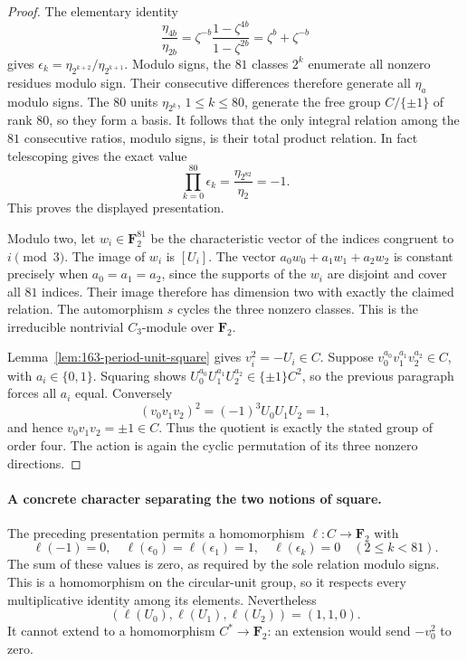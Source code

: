 \begin{proof}
The elementary identity
\[
 \frac{\eta_{4b}}{\eta_{2b}}
 =\zeta^{-b}\frac{1-\zeta^{4b}}{1-\zeta^{2b}}
 =\zeta^b+\zeta^{-b}
\]
gives
\(\epsilon_k=\eta_{2^{k+2}}/\eta_{2^{k+1}}\).
Modulo signs, the \(81\) classes \(2^k\) enumerate all nonzero
residues modulo sign.  Their consecutive differences therefore
generate all \(\eta_a\) modulo signs.  The \(80\) units
\(\eta_{2^k}\), \(1\leq k\leq80\), generate the free group
\(C/\{\pm1\}\) of rank \(80\), so they form a basis.
It follows that the only integral relation among the \(81\)
consecutive ratios, modulo signs, is their total product relation.
In fact telescoping gives the exact value
\[
 \prod_{k=0}^{80}\epsilon_k
 =\frac{\eta_{2^{82}}}{\eta_2}=-1.
\]
This proves the displayed presentation.

Modulo two, let \(w_i\in\mathbf F_2^{81}\) be the characteristic
vector of the indices congruent to \(i\pmod3\).  The image of
\(w_i\) is \([U_i]\).  The vector
\(a_0w_0+a_1w_1+a_2w_2\) is constant precisely when
\(a_0=a_1=a_2\), since the supports of the \(w_i\) are disjoint
and cover all \(81\) indices.  Their image therefore has dimension
two with exactly the claimed relation.  The automorphism \(s\)
cycles the three nonzero classes.  This is the irreducible nontrivial
\(C_3\)-module over \(\mathbf F_2\).

Lemma~\ref{lem:163-period-unit-square} gives \(v_i^2=-U_i\in C\).
Suppose \(v_0^{a_0}v_1^{a_1}v_2^{a_2}\in C\), with
\(a_i\in\{0,1\}\).  Squaring shows
\(U_0^{a_0}U_1^{a_1}U_2^{a_2}\in\{\pm1\}C^2\), so the
previous paragraph forces all \(a_i\) equal.  Conversely
\[
 (v_0v_1v_2)^2=(-1)^3U_0U_1U_2=1,
\]
and hence \(v_0v_1v_2=\pm1\in C\).  Thus the quotient is exactly
the stated group of order four.  The action is again the cyclic
permutation of its three nonzero directions.
\end{proof}

\paragraph{A concrete character separating the two notions of square.}
The preceding presentation permits a homomorphism
\(\ell:C\to\mathbf F_2\) with
\[
 \ell(-1)=0,\quad \ell(\epsilon_0)=\ell(\epsilon_1)=1,
 \quad\ell(\epsilon_k)=0\quad(2\leq k<81).
\]
The sum of these values is zero, as required by the sole relation
modulo signs.  This is a homomorphism on the circular-unit
group, so it respects every multiplicative identity among its
elements.  Nevertheless
\[
 (\ell(U_0),\ell(U_1),\ell(U_2))=(1,1,0).
\]
It cannot extend to a homomorphism \(C^*\to\mathbf F_2\):
an extension would send \(-v_0^2\) to zero.

